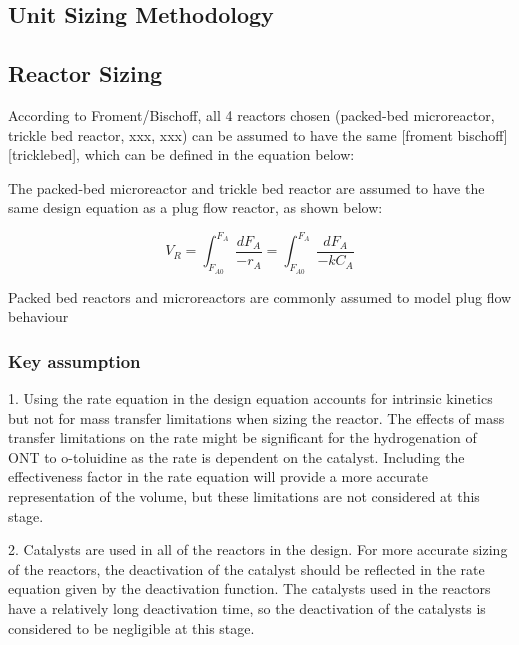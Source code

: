 \begin{landscape}
\section{Unit Sizing Methodology}
\label{app:sizing}
\subsection{Reactor Sizing}
According to Froment/Bischoff, all 4 reactors chosen (packed-bed microreactor, trickle bed reactor, xxx, xxx) can be assumed to have the same [froment bischoff][tricklebed], which can be defined in the equation below:

The packed-bed microreactor and trickle bed reactor are assumed to have the same design equation as a plug flow reactor, as shown below:

\begin{equation}
    V_R = \int_{F_{A0}}^{F_{A}} \frac{dF_A}{-r_A} = \int_{F_{A0}}^{F_{A}} \frac{dF_A}{-kC_A}
    \label{reactor_sizing}
\end{equation}

Packed bed reactors and microreactors are commonly assumed to model plug flow behaviour 

\subsubsection{Key assumption}
 
1.  Using the rate equation in the design equation accounts for intrinsic kinetics but not for mass transfer limitations when sizing the reactor. The effects of mass transfer limitations on the rate might be significant for the hydrogenation of ONT to o-toluidine as the rate is dependent on the catalyst. Including the effectiveness factor in the rate equation will provide a more accurate representation of the volume, but these limitations are not considered at this stage.

2.  Catalysts are used in all of the reactors in the design. For more accurate sizing of the reactors, the deactivation of the catalyst should be reflected in the rate equation given by the deactivation function. The catalysts used in the reactors have a relatively long deactivation time, so the deactivation of the catalysts is considered to be negligible at this stage. 


\end{landscape}

